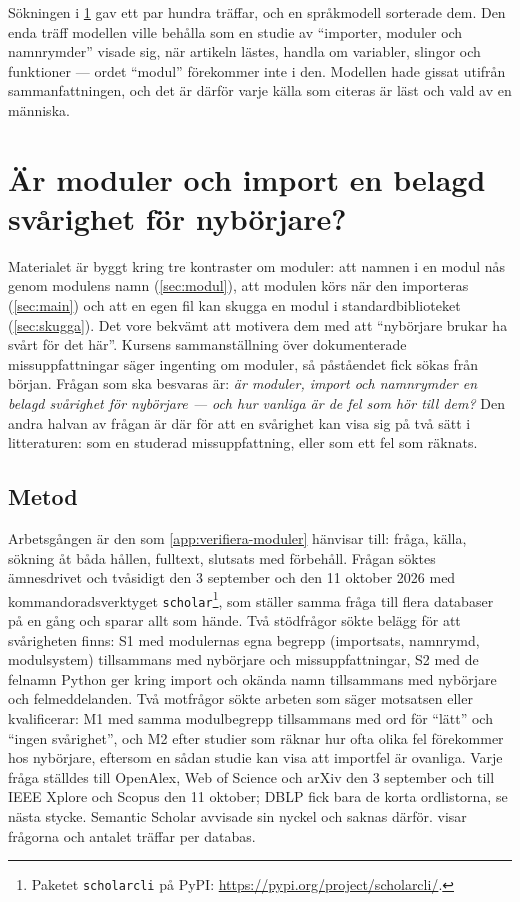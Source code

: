 Sökningen i \cref{app:moduler} gav ett par hundra träffar, och en
språkmodell sorterade dem.  Den enda träff modellen ville behålla som en
studie av \enquote{importer, moduler och namnrymder} visade sig, när
artikeln lästes, handla om variabler, slingor och funktioner --- ordet
\enquote{modul} förekommer inte i den.  Modellen hade gissat utifrån
sammanfattningen, och det är därför varje källa som citeras är läst och
vald av en människa.

\chapter{Är moduler och import en belagd svårighet för nybörjare?}
\label{app:moduler}

Materialet är byggt kring tre kontraster om moduler: att namnen i en
modul nås genom modulens namn (\cref{sec:modul}), att modulen körs när
den importeras (\cref{sec:main}) och att en egen fil kan skugga en
modul i standardbiblioteket (\cref{sec:skugga}).  Det vore bekvämt att
motivera dem med att \enquote{nybörjare brukar ha svårt för det här}.
Kursens sammanställning över dokumenterade missuppfattningar
\autocite{SooriBosk2026} säger ingenting om moduler, så påståendet fick
sökas från början.  Frågan som
ska besvaras är: \emph{är moduler, import och namnrymder en belagd
svårighet för nybörjare --- och hur vanliga är de fel som hör till dem?}
Den andra halvan av frågan är där för att en svårighet kan visa sig på
två sätt i litteraturen: som en studerad missuppfattning, eller som ett
fel som räknats.

\section{Metod}
\label{sec:mod-metod}

Arbetsgången är den som \cref{app:verifiera-moduler} hänvisar till:
fråga, källa, sökning åt båda hållen, fulltext, slutsats med förbehåll.
Frågan söktes ämnesdrivet och tvåsidigt den 3 september och den 11
oktober 2026 med kommandoradsverktyget \texttt{scholar}\footnote{Paketet
  \texttt{scholarcli} på PyPI:
  \url{https://pypi.org/project/scholarcli/}.}, som ställer samma fråga
till flera databaser på en gång och sparar allt som hände.  Två
stödfrågor sökte belägg för att svårigheten finns: S1 med modulernas
egna begrepp (importsats, namnrymd, modulsystem) tillsammans med
nybörjare och missuppfattningar, S2 med de felnamn Python ger kring
import och okända namn tillsammans med nybörjare och felmeddelanden.  Två
motfrågor sökte arbeten som säger motsatsen eller kvalificerar: M1 med
samma modulbegrepp tillsammans med ord för \enquote{lätt} och
\enquote{ingen svårighet}, och M2 efter studier som räknar hur ofta
olika fel förekommer hos nybörjare, eftersom en sådan studie kan visa
att importfel är ovanliga.  Varje fråga ställdes till OpenAlex, Web of
Science och arXiv den 3 september och till IEEE Xplore och Scopus den
11 oktober; DBLP fick bara de korta ordlistorna, se nästa stycke.
Semantic Scholar avvisade sin nyckel och saknas därför.
 visar frågorna och antalet träffar per databas.

